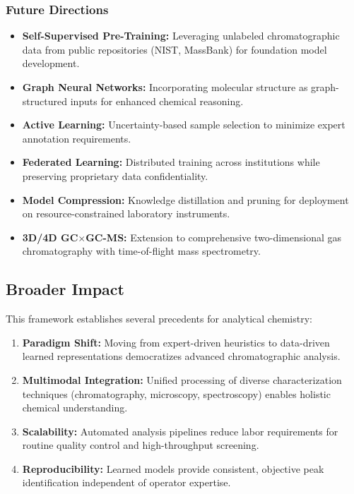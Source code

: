 \documentclass[12pt,a4paper]{article}
\begin{document}
\subsubsection{Future Directions}

\begin{itemize}
    \item \textbf{Self-Supervised Pre-Training:} Leveraging unlabeled chromatographic data from public repositories (NIST, MassBank) for foundation model development.
    
    \item \textbf{Graph Neural Networks:} Incorporating molecular structure as graph-structured inputs for enhanced chemical reasoning.
    
    \item \textbf{Active Learning:} Uncertainty-based sample selection to minimize expert annotation requirements.
    
    \item \textbf{Federated Learning:} Distributed training across institutions while preserving proprietary data confidentiality.
    
    \item \textbf{Model Compression:} Knowledge distillation and pruning for deployment on resource-constrained laboratory instruments.
    
    \item \textbf{3D/4D GC$\times$GC-MS:} Extension to comprehensive two-dimensional gas chromatography with time-of-flight mass spectrometry.
\end{itemize}

\subsection{Broader Impact}

This framework establishes several precedents for analytical chemistry:

\begin{enumerate}
    \item \textbf{Paradigm Shift:} Moving from expert-driven heuristics to data-driven learned representations democratizes advanced chromatographic analysis.
    
    \item \textbf{Multimodal Integration:} Unified processing of diverse characterization techniques (chromatography, microscopy, spectroscopy) enables holistic chemical understanding.
    
    \item \textbf{Scalability:} Automated analysis pipelines reduce labor requirements for routine quality control and high-throughput screening.
    
    \item \textbf{Reproducibility:} Learned models provide consistent, objective peak identification independent of operator expertise.
\end{enumerate}
\end{document}
